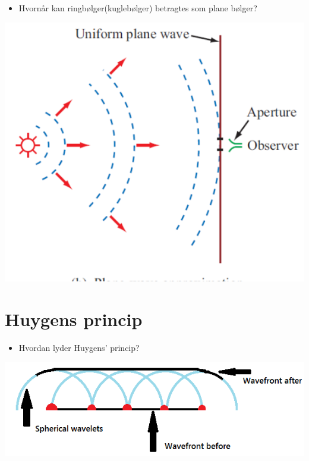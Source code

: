 \documentclass[a4paper, 12pt]{article}
\begin{document}
\begin{minipage}{0.3\linewidth}
\begin{itemize}
\item Hvornår kan ringbølger(kuglebølger) betragtes som plane bølger?
\end{itemize}
\end{minipage}
\vline
\begin{minipage}{0.68\linewidth}
\begin{center}
\includegraphics[width=.9\linewidth]{./img/ring_og_plane_boelger.png}
\end{center}
\end{minipage}

\vfill

\newpage
\section*{Huygens princip}
\label{sec:orgd360dc2}

\begin{minipage}{0.3\linewidth}
\begin{itemize}
\item Hvordan lyder Huygens' princip?
\end{itemize}
\end{minipage}
\vline
\begin{minipage}{0.68\linewidth}
\begin{center}
\includegraphics[width=.9\linewidth]{./img/huygens.png}
\end{center}
\end{minipage}
\end{document}
